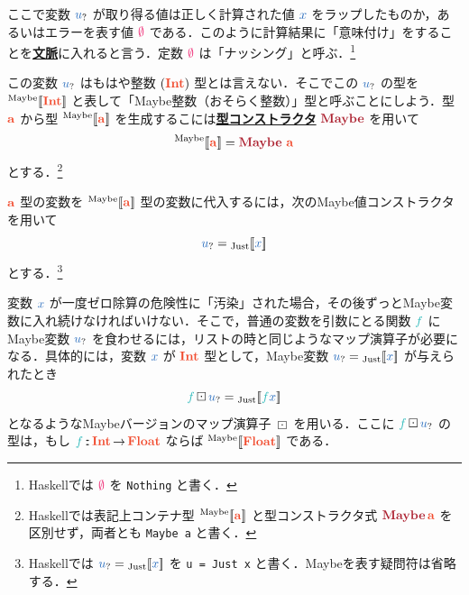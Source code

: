 \documentclass[a5paper,twoside,fleqn,draft]{jsbook}
\def\[{[\![}
\def\]{]\!]}
\def\constantColor{WildStrawberry}
\def\varColor{NavyBlue}
\def\funcColor{BlueGreen}
\def\typeColor{RedOrange}
\def\typeConstColor{Maroon}
\newcommand{\programminglanguage}[1]{\textsf{#1}}
\newcommand{\haskell}{\programminglanguage{Haskell}}
\newcommand{\keyword}[1]{{\underline{\textbf{#1}}}}
\newcommand{\code}[1]{\texttt{#1}}
\newcommand{\mSpecialTypeConstructor}[1]{\textcolor{\typeConstColor}{\textbf{#1}}}
\newcommand{\mNothing}{\textcolor{\constantColor}{\emptyset}}
\newcommand{\mVar}[1]{\textcolor{\varColor}{#1}}
\newcommand{\mXVar}{\mVar{x}}
\newcommand{\mFunc}[1]{\textcolor{\funcColor}{#1}}
\newcommand{\mFFunc}{{\mFunc{f}}}
\DeclareMathOperator{\mFuncArrow}{\rightarrow}
\DeclareMathOperator{\mIn}{{:\!:}}
\DeclareMathOperator{\mMapMaybe}{\boxdot}
\newcommand{\mType}[1]{\textcolor{\typeColor}{\mathbf{#1}}}
\newcommand{\mA}{\mType{a}}
\newcommand{\mFloatType}{\mType{Float}}
\newcommand{\mIntType}{\mType{Int}}
\newcommand{\mTypeAssemble}[2]{{}^\mathrm{#1}\[\mType{#2}\]}
\newcommand{\mMaybeType}[1]{\mTypeAssemble{Maybe}{#1}}
\DeclareMathOperator{\mMaybeTypeConstructor}{\mSpecialTypeConstructor{Maybe}}
\newcommand{\mValueConstructor}[1]{\mathrm{#1}}
\newcommand{\mValueWith}[2]{{}_\mValueConstructor{#1}\[\mVar{#2}\]}
\newcommand{\mJustWith}[1]{\mValueWith{Just}{#1}}
\newcommand{\mMaybe}[1]{\mVar{#1}_?}
\newcommand{\mProjEXP}[2]{#1\mFuncArrow#2} %
\begin{document}
ここで変数 $\mMaybe{u}$ が取り得る値は正しく計算された値 $\mXVar$ をラップしたものか，あるいはエラーを表す値 $\mNothing$ である．このように計算結果に「意味付け」をすることを\keyword{文脈}に入れると言う．定数 $\mNothing$ は「ナッシング」と呼ぶ．\footnote{\haskell では $\mNothing$ を \code{Nothing} と書く．}

この変数 $\mMaybe{u}$ はもはや整数 $(\mIntType)$ 型とは言えない．そこでこの $\mMaybe{u}$ の型を $\mMaybeType{\mIntType}$ と表して「Maybe整数（おそらく整数）」型と呼ぶことにしよう．型 $\mA $ から型 $\mMaybeType{a}$ を生成するこには\keyword{型コンストラクタ} $\mMaybeTypeConstructor$ を用いて
\begin{equation}
  \mMaybeType{a}
  =\mMaybeTypeConstructor\,\mA
\end{equation}
とする．\footnote{\haskell では表記上コンテナ型 $\mMaybeType{a}$ と型コンストラクタ式 $\mMaybeTypeConstructor\mA$ を区別せず，両者とも \code{Maybe a} と書く．}

$\mA $ 型の変数を $\mMaybeType{a}$ 型の変数に代入するには，次のMaybe値コンストラクタを用いて
\begin{equation}
  \mMaybe{u}
  =\mJustWith{x}
\end{equation}
とする．\footnote{\haskell では $\mMaybe{u}=\mJustWith{x}$ を \code{u = Just x} と書く．Maybeを表す疑問符は省略する．}

変数 $\mXVar$ が一度ゼロ除算の危険性に「汚染」された場合，その後ずっとMaybe変数に入れ続けなければいけない．そこで，普通の変数を引数にとる関数 $\mFFunc$ にMaybe変数 $\mMaybe{u}$ を食わせるには，リストの時と同じようなマップ演算子が必要になる．具体的には，変数 $\mXVar$ が $\mType{Int}$ 型として，Maybe変数 $\mMaybe{u}=\mJustWith{x}$ が与えられたとき
\begin{equation}
  \mFFunc\mMapMaybe\mMaybe{u}
  =\mJustWith{\mFFunc\mXVar}
\end{equation}
となるようなMaybeバージョンのマップ演算子 $\mMapMaybe$ を用いる．ここに $\mFFunc\mMapMaybe\mMaybe{u}$ の型は，もし $\mFFunc\mIn\mProjEXP{\mIntType}{\mFloatType}$ ならば $\mMaybeType{\mFloatType}$ である．
\end{document}
